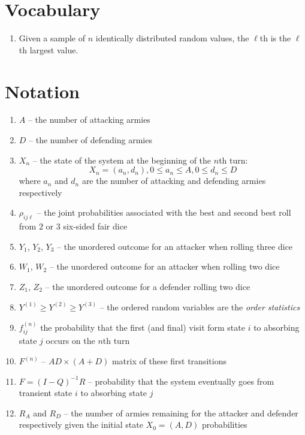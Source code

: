 \documentclass[12pt]{article}
\begin{document}
\hr

\section*{Vocabulary}
\begin{enumerate}
    \item
        Given a sample of \( n \) identically distributed random values,
        the \( \ell \)th  is the \( \ell \)th
        largest value.%
\end{enumerate}

\hr

\section*{Notation}
\begin{enumerate}
    \item
        \( A \) -- the number of attacking armies
    \item
        \( D \) -- the number of defending armies
    \item
        \( X_n \) -- the state of the system at the beginning of the \(
        n \)th turn:
        \[
            X_n = (a_n, d_n), 0 \le a_n \le A, 0 \le d_n \le D
        \] where \( a_n \) and \( d_n \) are the number of attacking and
        defending armies respectively
    \item
        \( \rho_{i j \ell} \) -- the joint probabilities associated with
        the best and second best roll from \( 2 \) or \( 3 \) six-sided
        fair dice
    \item
        \( Y_1 \), \( Y_2 \), \( Y_3 \) -- the unordered outcome for an
        attacker when rolling three dice
    \item
        \( W_1 \), \( W_2 \) -- the unordered outcome for an attacker
        when rolling two dice
    \item
        \( Z_1 \), \( Z_2 \) -- the unordered outcome for a defender
        rolling two dice
    \item
        \( Y^{(1)} \ge Y^{(2)} \ge Y^{(3)} \) -- the ordered random
        variables are the \emph{order statistics}
    \item
        \( f_{ij}^{(n)} \) the probability that the first (and final)
        visit form state \( i \) to absorbing state \( j \) occurs on
        the \( n \)th turn
    \item
        \( F^{(n)} \) -- \( AD \times (A + D) \) matrix of these first
        transitions
    \item
        \( F = (I - Q)^{-1} R \) -- probability that the system
        eventually goes from transient state \( i \) to absorbing state \(
        j \)
    \item
        \( R_A \) and \( R_D \) -- the number of armies remaining for
        the attacker and defender respectively given the initial state \(
        X_0 = (A, D) \) probabilities
\end{enumerate}
\end{document}

